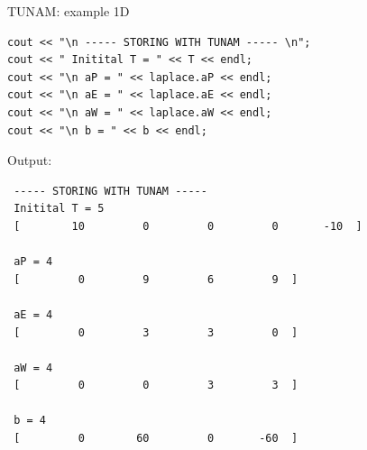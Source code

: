 \documentclass[handout]{beamer}
\begin{document}
\begin{frame}[fragile]{TUNAM: example 1D}

\begin{tiny}

\begin{lstlisting}
cout << "\n ----- STORING WITH TUNAM ----- \n";
cout << " Initital T = " << T << endl;
cout << "\n aP = " << laplace.aP << endl; 
cout << "\n aE = " << laplace.aE << endl; 
cout << "\n aW = " << laplace.aW << endl; 
cout << "\n b = " << b << endl;
\end{lstlisting}

Output:

\begin{verbatim}
 ----- STORING WITH TUNAM ----- 
 Initital T = 5
 [        10         0         0         0       -10  ]

 aP = 4
 [         0         9         6         9  ]

 aE = 4
 [         0         3         3         0  ]

 aW = 4
 [         0         0         3         3  ]

 b = 4
 [         0        60         0       -60  ]
\end{verbatim}

\end{tiny}

\end{frame}
\end{document}
